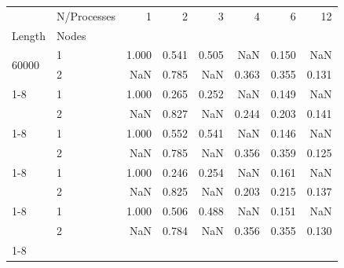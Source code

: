 \begin{tabular}{llrrrrrr}
\toprule
 & N/Processes & 1 & 2 & 3 & 4 & 6 & 12 \\
Length & Nodes &  &  &  &  &  &  \\
\midrule
\multirow[t]{2}{*}{60000} & 1 & 1.000 & 0.541 & 0.505 & NaN & 0.150 & NaN \\
 & 2 & NaN & 0.785 & NaN & 0.363 & 0.355 & 0.131 \\
\cline{1-8}
\multirow[t]{2}{*}{90000} & 1 & 1.000 & 0.265 & 0.252 & NaN & 0.149 & NaN \\
 & 2 & NaN & 0.827 & NaN & 0.244 & 0.203 & 0.141 \\
\cline{1-8}
\multirow[t]{2}{*}{120000} & 1 & 1.000 & 0.552 & 0.541 & NaN & 0.146 & NaN \\
 & 2 & NaN & 0.785 & NaN & 0.356 & 0.359 & 0.125 \\
\cline{1-8}
\multirow[t]{2}{*}{150000} & 1 & 1.000 & 0.246 & 0.254 & NaN & 0.161 & NaN \\
 & 2 & NaN & 0.825 & NaN & 0.203 & 0.215 & 0.137 \\
\cline{1-8}
\multirow[t]{2}{*}{180000} & 1 & 1.000 & 0.506 & 0.488 & NaN & 0.151 & NaN \\
 & 2 & NaN & 0.784 & NaN & 0.356 & 0.355 & 0.130 \\
\cline{1-8}
\bottomrule
\end{tabular}
